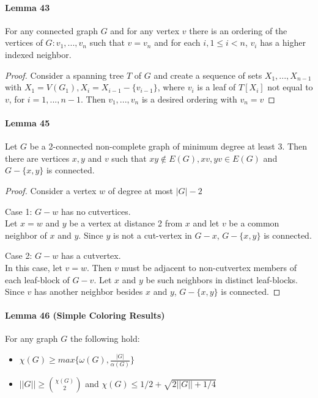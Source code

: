 \paragraph{Lemma 43} For any connected graph $G$ and for any vertex $v$ there
is an ordering of the vertices of $G: v_1,...,v_n$ such that $v=v_n$ and 
for each $i, 1 \leq i < n$, $v_i$ has a higher indexed neighbor.
\begin{proof}
    Consider a spanning tree $T$ of $G$ and create a sequence of sets 
    $X_1,...,X_{n-1}$ with $X_1 = V(G_1), X_i = X_{i-1} - \{v_{i-1}\}$, where
    $v_i$ is a leaf of $T[X_i]$ not equal to $v$, for $i = 1,...,n -1$.
    Then $v_1,...,v_n$ is a desired ordering with $v_n = v$
\end{proof}

\paragraph{Lemma 45} Let $G$ be a 2-connected non-complete graph of minimum
degree at least 3. Then there are vertices $x,y$ and $v$ such that 
$xy \notin E(G), xv,yv \in E(G)$ and $G-\{x,y\}$ is connected.
\begin{proof}
Consider a vertex $w$ of degree at most $|G|-2$

\smallskip \noindent
Case 1: $G-w$ has no cutvertices. \\
Let $x = w$ and $y$ be a vertex at distance 2 from $x$ and let $v$ be a 
common neighbor of $x$ and $y$. Since $y$ is not a cut-vertex in $G-x$, 
$G-\{x,y\}$ is connected.

\smallskip \noindent
Case 2: $G-w$ has a cutvertex. \\
In this case, let $v=w$. Then $v$ must be adjacent to non-cutvertex members of 
each leaf-block of $G-v$. Let $x$ and $y$ be such neighbors in distinct 
leaf-blocks. Since $v$ has another neighbor besides $x$ and $y$, 
$G-\{x,y\}$ is connected.
\end{proof}

\paragraph{Lemma 46 (Simple Coloring Results)} $ $ \\
For any graph $G$ the following hold: 
\begin{itemize}
    \item $\chi(G) \geq max\{\omega(G), \frac{|G|}{\alpha(G)}\} $
    \item $||G|| \geq \binom{\chi(G)}{2}$ and $ \chi(G) \leq 1/2 + 
    \sqrt{2||G||+1/4}$
\end{itemize}

